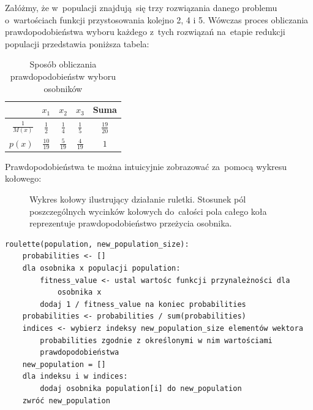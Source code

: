 \documentclass[12pt,a4paper]{article}
\theoremstyle{definition}
\begin{document}
\begin{tcolorbox}[title=Przykład --- Metoda koła ruletki]
Załóżmy, że w~populacji znajdują~się trzy rozwiązania danego problemu o~wartościach funkcji przystosowania kolejno
2, 4 i 5.
Wówczas proces obliczania prawdopodobieństwa wyboru każdego z~tych rozwiązań na~etapie redukcji populacji przedstawia poniższa tabela:
\begin{table}[H]
\centering
\def\arraystretch{1.5}
\begin{tabular}{r|ccc|c}
{} & $x_1$ & $x_2$ & $x_3$ & Suma \\
\hline
$\frac{1}{M(x)}$ & $\frac{1}{2}$ & $\frac{1}{4}$ & $\frac{1}{5}$ & $\frac{19}{20}$ \\
$p(x)$ & $\frac{10}{19}$ & $\frac{5}{19}$ & $\frac{4}{19}$ & $1$
\end{tabular}
\caption{Sposób obliczania prawdopodobieństw wyboru osobników}
\end{table}
Prawdopodobieństwa te można intuicyjnie zobrazować za~pomocą wykresu kołowego:
\begin{figure}[H]
\centering
\newcommand{\slice}[4]{
  \pgfmathparse{0.5*#1+0.5*#2}
  \let\midangle\pgfmathresult

  \draw[thick,fill=black!10] (0,0) -- (#1:1) arc (#1:#2:1) -- cycle;

  \node[label=\midangle:#4] at (\midangle:1) {};

  \pgfmathparse{min((#2-#1-10)/110*(-0.3),0)}
  \let\temp\pgfmathresult
  \pgfmathparse{max(\temp,-0.5) + 0.8}
  \let\innerpos\pgfmathresult
  \node at (\midangle:\innerpos) {#3};
}

\caption{Wykres kołowy ilustrujący działanie ruletki.
Stosunek pól poszczególnych wycinków kołowych do~całości pola całego koła reprezentuje prawdopodobieństwo przeżycia osobnika.}
\end{figure}
\end{tcolorbox}

\begin{tcolorbox}[title=Metoda koła ruletki -- pseudokod]
\begin{verbatim}
roulette(population, new_population_size):
    probabilities <- []
    dla osobnika x populacji population:
        fitness_value <- ustal wartośc funkcji przynależności dla 
            osobnika x
        dodaj 1 / fitness_value na koniec probabilities
    probabilities <- probabilities / sum(probabilities)
    indices <- wybierz indeksy new_population_size elementów wektora 
        probabilities zgodnie z określonymi w nim wartościami
        prawdopodobieństwa
    new_population = []
    dla indeksu i w indices:
        dodaj osobnika population[i] do new_population
    zwróć new_population
\end{verbatim}
\end{tcolorbox}
\end{document}
